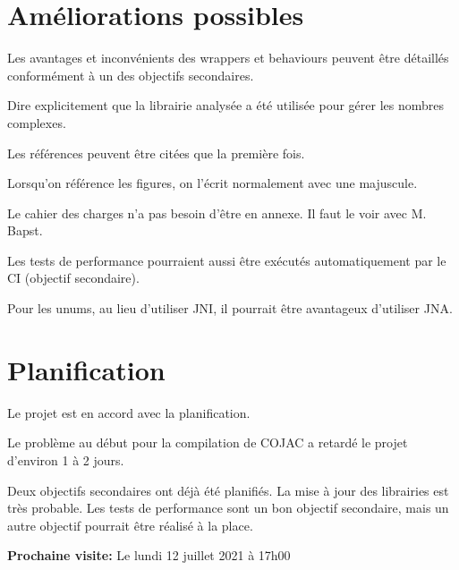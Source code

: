 \documentclass[11pt]{meetingmins}
\begin{document}
\section{Améliorations possibles}
\begin{hiddenitems}
    \item Les avantages et inconvénients des wrappers et behaviours peuvent être détaillés conformément à un des objectifs secondaires.
    \item Dire explicitement que la librairie analysée a été utilisée pour gérer les nombres complexes.
    \item Les références peuvent être citées que la première fois.
    \item Lorsqu'on référence les figures, on l'écrit normalement avec une majuscule.
    \item Le cahier des charges n'a pas besoin d'être en annexe. Il faut le voir avec M. Bapst.
    \item Les tests de performance pourraient aussi être exécutés automatiquement par le CI (objectif secondaire).
    \item Pour les unums, au lieu d'utiliser JNI, il pourrait être avantageux d'utiliser JNA.
\end{hiddenitems}


\section{Planification}
\begin{hiddenitems}
    \item Le projet est en accord avec la planification.
    \item Le problème au début pour la compilation de COJAC a retardé le projet d'environ 1 à 2 jours.
    \item Deux objectifs secondaires ont déjà été planifiés. La mise à jour des librairies est très probable. Les tests de performance sont un bon objectif secondaire, mais un autre objectif pourrait être réalisé à la place.
\end{hiddenitems}

\vspace{1em}
\par \noindent \textbf {Prochaine visite:} Le lundi 12 juillet 2021 à 17h00
\end{document}
